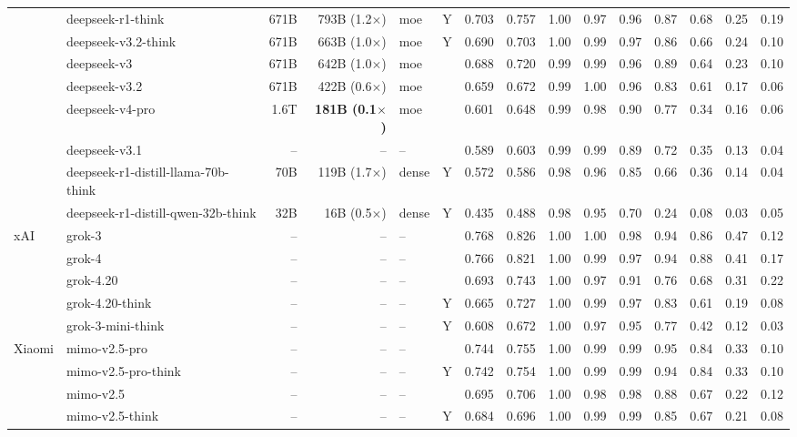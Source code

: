 \begin{longtable}{@{}ll r r l c rr rrrrrrr@{}}
 & deepseek-r1-think & 671B & 793B (1.2$\times$) & moe & Y & 0.703 & 0.757 & 1.00 & 0.97 & 0.96 & 0.87 & 0.68 & 0.25 & 0.19 \\
 & deepseek-v3.2-think & 671B & 663B (1.0$\times$) & moe & Y & 0.690 & 0.703 & 1.00 & 0.99 & 0.97 & 0.86 & 0.66 & 0.24 & 0.10 \\
 & deepseek-v3 & 671B & 642B (1.0$\times$) & moe &  & 0.688 & 0.720 & 0.99 & 0.99 & 0.96 & 0.89 & 0.64 & 0.23 & 0.10 \\
 & deepseek-v3.2 & 671B & 422B (0.6$\times$) & moe &  & 0.659 & 0.672 & 0.99 & 1.00 & 0.96 & 0.83 & 0.61 & 0.17 & 0.06 \\
 & deepseek-v4-pro & 1.6T & \textbf{181B (0.1$\times$)} & moe &  & 0.601 & 0.648 & 0.99 & 0.98 & 0.90 & 0.77 & 0.34 & 0.16 & 0.06 \\
 & deepseek-v3.1 & -- & -- & -- &  & 0.589 & 0.603 & 0.99 & 0.99 & 0.89 & 0.72 & 0.35 & 0.13 & 0.04 \\
 & deepseek-r1-distill-llama-70b-think & 70B & 119B (1.7$\times$) & dense & Y & 0.572 & 0.586 & 0.98 & 0.96 & 0.85 & 0.66 & 0.36 & 0.14 & 0.04 \\
 & deepseek-r1-distill-qwen-32b-think & 32B & 16B (0.5$\times$) & dense & Y & 0.435 & 0.488 & 0.98 & 0.95 & 0.70 & 0.24 & 0.08 & 0.03 & 0.05 \\
xAI & grok-3 & -- & -- & -- &  & 0.768 & 0.826 & 1.00 & 1.00 & 0.98 & 0.94 & 0.86 & 0.47 & 0.12 \\
 & grok-4 & -- & -- & -- &  & 0.766 & 0.821 & 1.00 & 0.99 & 0.97 & 0.94 & 0.88 & 0.41 & 0.17 \\
 & grok-4.20 & -- & -- & -- &  & 0.693 & 0.743 & 1.00 & 0.97 & 0.91 & 0.76 & 0.68 & 0.31 & 0.22 \\
 & grok-4.20-think & -- & -- & -- & Y & 0.665 & 0.727 & 1.00 & 0.99 & 0.97 & 0.83 & 0.61 & 0.19 & 0.08 \\
 & grok-3-mini-think & -- & -- & -- & Y & 0.608 & 0.672 & 1.00 & 0.97 & 0.95 & 0.77 & 0.42 & 0.12 & 0.03 \\
Xiaomi & mimo-v2.5-pro & -- & -- & -- &  & 0.744 & 0.755 & 1.00 & 0.99 & 0.99 & 0.95 & 0.84 & 0.33 & 0.10 \\
 & mimo-v2.5-pro-think & -- & -- & -- & Y & 0.742 & 0.754 & 1.00 & 0.99 & 0.99 & 0.94 & 0.84 & 0.33 & 0.10 \\
 & mimo-v2.5 & -- & -- & -- &  & 0.695 & 0.706 & 1.00 & 0.98 & 0.98 & 0.88 & 0.67 & 0.22 & 0.12 \\
 & mimo-v2.5-think & -- & -- & -- & Y & 0.684 & 0.696 & 1.00 & 0.99 & 0.99 & 0.85 & 0.67 & 0.21 & 0.08 \\

\end{longtable}
